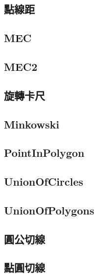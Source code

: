 \documentclass[a4paper,10pt,twocolumn,oneside]{article}
\begin{document}
    \subsection{點線距}
    

    \subsection{MEC}
    

    \subsection{MEC2}
    

    \subsection{旋轉卡尺}
    
    
    \subsection{Minkowski}
    

    \subsection{PointInPolygon}
    

    \subsection{UnionOfCircles}
    

    \subsection{UnionOfPolygons}
    

    \subsection{圓公切線}
    

    \subsection{點圓切線}
    
\end{document}
